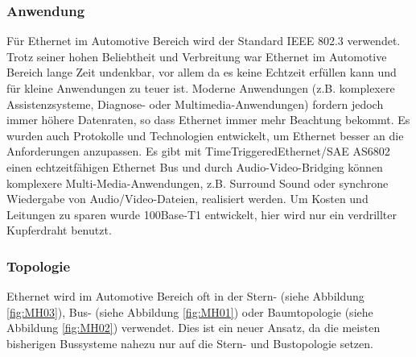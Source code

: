     \subsubsection{Anwendung}
    Für Ethernet im Automotive Bereich wird der Standard IEEE 802.3 verwendet. Trotz seiner hohen Beliebtheit und 
    Verbreitung war Ethernet im Automotive Bereich lange Zeit undenkbar, vor allem da es keine
     Echtzeit erfüllen kann und für kleine Anwendungen zu teuer ist. Moderne Anwendungen (z.B. komplexere Assistenzsysteme, 
     Diagnose- oder Multimedia-Anwendungen) fordern jedoch immer höhere Datenraten, so dass Ethernet immer mehr Beachtung bekommt. 
     Es wurden auch Protokolle und Technologien entwickelt, um Ethernet besser an die Anforderungen anzupassen. 
     Es gibt mit TimeTriggeredEthernet/SAE AS6802 einen echtzeitfähigen Ethernet Bus und durch Audio-Video-Bridging können 
     komplexere Multi-Media-Anwendungen, z.B. Surround Sound oder synchrone Wiedergabe von Audio/Video-Dateien, realisiert werden. 
     Um Kosten und Leitungen zu sparen wurde 100Base-T1 entwickelt, hier wird nur ein verdrillter Kupferdraht benutzt. 
     \cite{.MH_Ethernet} \cite{.MH_Review}
    
    \subsubsection{Topologie}
    Ethernet wird im Automotive Bereich oft in der Stern- (siehe Abbildung \ref{fig:MH03}), Bus- (siehe Abbildung \ref{fig:MH01}) oder Baumtopologie (siehe Abbildung \ref{fig:MH02}) verwendet. Dies ist ein neuer Ansatz, da die meisten bisherigen Bussysteme nahezu nur auf die Stern- und Bustopologie setzen.
    \cite{.MH_Review}
    
